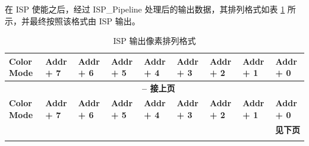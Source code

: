 \documentclass[main\_\_CN.tex]{subfiles}
\begin{document}
在 ISP 使能之后，经过 ISP\_Pipeline 处理后的输出数据，其排列格式如表 \ref{tab:isp_output_color_space} 所示，并最终按照该格式由 ISP 输出。

\scriptsize
\begin{longtable}[c]{ |p{2cm}|p{1.5cm}|p{1.5cm}|p{1.5cm}|p{1.5cm}|p{1.5cm}|p{1.5cm}|p{1.5cm}|p{1.5cm}| }
    \caption{ISP 输出像素排列格式}
    \label{tab:isp_output_color_space}\\\hline

    \rowcolor{lightgray}
    \textbf{Color Mode} & \textbf{Addr + 7} & \textbf{Addr + 6} & \textbf{Addr + 5} & \textbf{Addr + 4} & \textbf{Addr + 3} & \textbf{Addr + 2} & \textbf{Addr + 1} & \textbf{Addr + 0} \\\hline
    \endfirsthead


    \multicolumn{9}{c}{\bfseries \tablename\ \thetable{} -- 接上页}\\\hline
    \rowcolor{lightgray}
    \textbf{Color Mode} & \textbf{Addr + 7} & \textbf{Addr + 6} & \textbf{Addr + 5} & \textbf{Addr + 4} & \textbf{Addr + 3} & \textbf{Addr + 2} & \textbf{Addr + 1} & \textbf{Addr + 0} \\\hline
    \endhead

    \multicolumn{9}{r}{\textbf{见下页}} \\
    \endfoot


\end{longtable}
\end{document}
